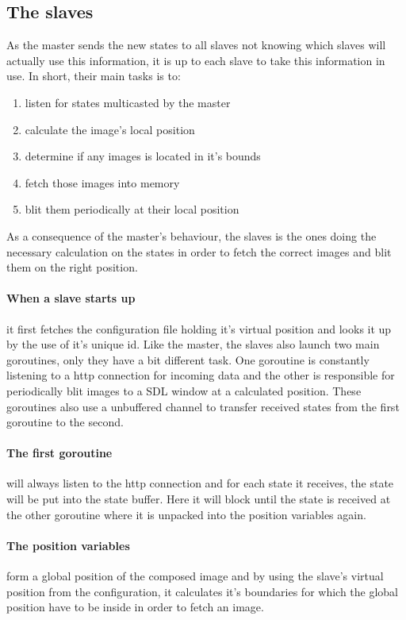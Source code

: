 \documentclass[12pt, a4paper, oneside]{article}
\begin{document}
\subsection{The slaves}
As the master sends the new states to all slaves not knowing which slaves will actually use this information, it is up to each slave to take this information in use. In short, their main tasks is to:
\begin{enumerate}
\item listen for states multicasted by the master
\item calculate the image's local position
\item determine if any images is located in it's bounds
\item fetch those images into memory
\item blit them periodically at their local position
\end{enumerate}

As a consequence of the master's behaviour, the slaves is the ones doing the necessary calculation on the states in order to fetch the correct images and blit them on the right position.

\paragraph{When a slave starts up}
it first fetches the configuration file holding it's virtual position and looks it up by the use of it's unique id. Like the master, the slaves also launch two main goroutines, only they have a bit different task. One goroutine is constantly listening to a http connection for incoming data and the other is responsible for periodically blit images to a SDL window at a calculated position. These goroutines also use a unbuffered channel to transfer received states from the first goroutine to the second. 

\paragraph{The first goroutine}
will always listen to the http connection and for each state it receives, the state will be put into the state buffer. Here it will block until the state is received at the other goroutine where it is unpacked into the position variables again. 

\paragraph{The position variables}
form a global position of the composed image and by using the slave's virtual position from the configuration, it calculates it's boundaries for which the global position have to be inside in order to fetch an image. 
\end{document}
